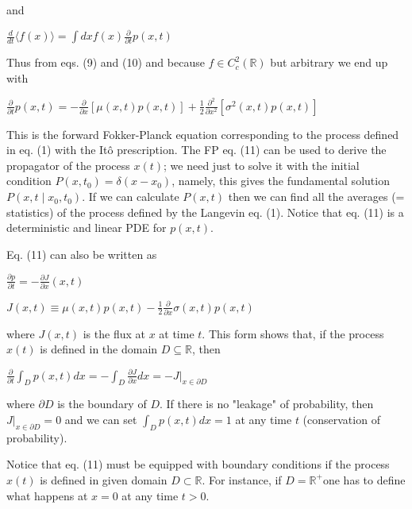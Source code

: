 and
\begin{DispWithArrows}
    $\frac{d}{d t}\langle f(x)\rangle=\int d x f(x) \frac{\partial}{\partial t} p(x, t)$
\end{DispWithArrows}
Thus from eqs. (9) and (10) and because $f \in C_{c}^{2}(\mathbb{R})$ but arbitrary we end up with
\begin{DispWithArrows}[tag=11]
    $\frac{\partial}{\partial t} p(x, t)=-\frac{\partial}{\partial x}[\mu(x, t) p(x, t)]+\frac{1}{2} \frac{\partial^{2}}{\partial x^{2}}\left[\sigma^{2}(x, t) p(x, t)\right]$
\end{DispWithArrows}
This is the forward Fokker-Planck equation corresponding to the process defined in eq. (1) with the Itô prescription. The FP eq. (11) can be used to derive the propagator of the process $x(t)$; we need just to solve it with the initial condition $P\left(x, t_{0}\right)=\delta\left(x-x_{0}\right)$, namely, this gives the fundamental solution $P\left(x, t \mid x_{0}, t_{0}\right)$. If we can calculate $P(x, t)$ then we can find all the averages (= statistics) of the process defined by the Langevin eq. (1). Notice that eq. (11) is a deterministic and linear PDE for $p(x, t)$.

Eq. (11) can also be written as
\begin{DispWithArrows}
    $\frac{\partial p}{\partial t}=-\frac{\partial J}{\partial x}(x, t)$
\end{DispWithArrows}
\begin{DispWithArrows}[tag=12]
    $J(x, t) \equiv \mu(x, t) p(x, t)-\frac{1}{2} \frac{\partial}{\partial x} \sigma(x, t) p(x, t)$
\end{DispWithArrows}
where $J(x, t)$ is the flux at $x$ at time $t$. This form shows that, if the process $x(t)$ is defined in the domain $D \subseteq \mathbb{R}$, then
\begin{DispWithArrows}
    $\frac{\partial}{\partial t} \int_{D} p(x, t) d x=-\int_{D} \frac{\partial J}{\partial x} d x=-\left.J\right|_{x \in \partial D}$
\end{DispWithArrows}
where $\partial D$ is the boundary of $D$. If there is no "leakage" of probability, then $\left.J\right|_{x \in \partial D}=0$ and we can set $\int_{D} p(x, t) d x=1$ at any time $t$ (conservation of probability).

Notice that eq. (11) must be equipped with boundary conditions if the process $x(t)$ is defined in given domain $D \subset \mathbb{R}$. For instance, if $D=\mathbb{R}^{+}$one has to define what happens at $x=0$ at any time $t>0$.

